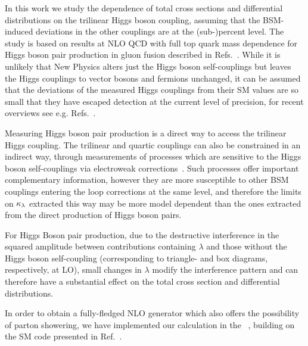 

In this work we study the dependence of total cross sections and differential distributions on the trilinear Higgs boson coupling, assuming that the BSM-induced deviations in the other couplings are at the (sub-)percent level.
The study is based on results at NLO QCD with full top quark mass dependence for Higgs boson pair production in gluon fusion described in Refs.~\cite{Borowka:2016ehy,Borowka:2016ypz}. 
While it is unlikely that New Physics alters just the Higgs boson self-couplings but leaves the Higgs couplings to vector bosons and fermions unchanged, it can be assumed that the deviations of the measured Higgs couplings from their SM values are so small that they have escaped detection at the current level of precision, for recent overviews see e.g. Refs.~\cite{Cepeda:2019klc,Dawson:2018dcd,Brooijmans:2018xbu,deFlorian:2016spz}.

Measuring Higgs boson pair production is a direct way to access the trilinear Higgs coupling. The trilinear and quartic couplings can also be constrained in an indirect way, through measurements of processes which are sensitive to the Higgs boson self-couplings via electroweak corrections~\cite{Gorbahn:2019lwq,Nakamura:2018bli,Borowka:2018pxx,Bizon:2018syu,Kilian:2018bhs,Vryonidou:2018eyv,Maltoni:2018ttu,Maltoni:2017ims,Kribs:2017znd,Degrassi:2017ucl,Bizon:2016wgr,Degrassi:2016wml,Gorbahn:2016uoy,McCullough:2013rea}.
Such processes offer important complementary information, however they are more susceptible to other BSM couplings entering the loop corrections 
at the same level, and therefore the limits on $\kappa_{\lambda}$ extracted this way may be more model dependent than the ones extracted from the direct production of Higgs boson pairs.

For Higgs Boson pair production, due to the destructive interference in the squared amplitude between contributions containing $\lambda$ and those without the Higgs boson self-coupling (corresponding to triangle- and box diagrams, respectively, at LO), 
small changes in $\lambda$ modify the interference pattern and can therefore have a substantial effect on the total cross section and differential distributions.

In order to obtain a fully-fledged NLO generator which also offers the possibility of parton showering, we have implemented our calculation in the 
\powhegbox~\cite{Nason:2004rx,Frixione:2007vw,Alioli:2010xd}, building on the SM code presented in Ref.~\cite{Heinrich:2017kxx}.

